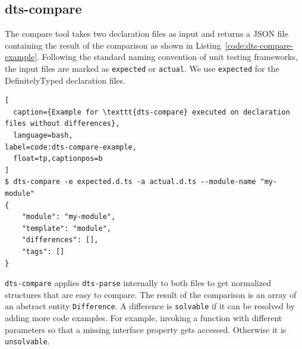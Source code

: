 \documentclass[english,cleveref,autoref,submission]{programming}
\newcommand{\coderef}[1]{Listing~\ref{#1}}
\begin{document}

\subsection{dts-compare}
\label{sec:dts-compare}

The compare tool takes two declaration files as input and returns a
JSON file containing the result of the comparison as shown in
\coderef{code:dts-compare-example}. Following the standard naming convention of unit
testing frameworks, the input files are marked as \lstinline{expected} or
\lstinline{actual}. We use \lstinline{expected} for the DefinitelyTyped
declaration files. 

\begin{lstlisting}[
  caption={Example for \texttt{dts-compare} executed on declaration files without differences},
  language=bash,
label=code:dts-compare-example,
  float=tp,captionpos=b
]
$ dts-compare -e expected.d.ts -a actual.d.ts --module-name "my-module"
{
    "module": "my-module",
    "template": "module",
    "differences": [],
    "tags": []
}
\end{lstlisting}

\texttt{dts-compare} applies \texttt{dts-parse} internally to both files to get 
normalized structures that are easy to compare. The result of the comparison is an array
of an abstract entity \texttt{Difference}. 
A difference is \texttt{solvable} if it can be resolved by adding more code
examples. For example, invoking a function with different parameters so that a missing
interface property gets accessed. Otherwise it is  \texttt{unsolvable}. 
\end{document}
